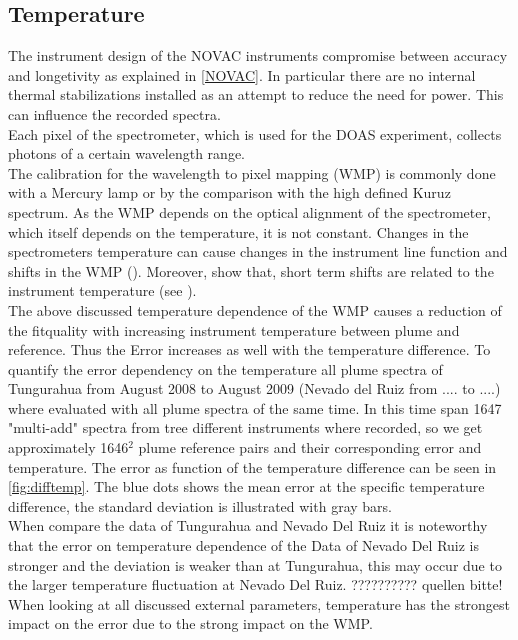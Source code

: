 \documentclass  [
  paper    = a4,
  BCOR     = 10mm,
  twoside,
  fontsize = 12pt,
  fleqn,
  toc      = bibnumbered,
  toc      = listofnumbered,
  numbers  = noendperiod,
  headings = normal,
  listof   = leveldown,
  version  = 3.03
]                                       {scrreprt}
\begin{document}
	\subsection{Temperature}
	The instrument design of the NOVAC instruments compromise between accuracy and longetivity as explained in \cref{NOVAC}. In particular there are no internal thermal stabilizations installed as an attempt to reduce the need for power. This can influence the recorded spectra.\\	
	Each pixel of the spectrometer, which is used for the DOAS experiment, collects photons of a certain wavelength range.\\
	The calibration for the wavelength to pixel mapping (WMP) is commonly done with a Mercury lamp or by the comparison with the high defined Kuruz spectrum.
	As the WMP depends on the optical alignment of the spectrometer, which itself depends on the temperature, it is not constant.
	Changes in the spectrometers temperature can cause changes in the instrument line function and shifts in the WMP (\cite{pinardi2007influence}). 
	Moreover, \cite{WarnachSimon} show that, short term shifts are related to the instrument temperature (see ).\\
	The above discussed temperature dependence of the WMP causes a reduction of the fitquality with increasing instrument temperature between plume and reference. Thus the  Error increases as well with the temperature difference. To quantify the  error dependency on the temperature all plume spectra of Tungurahua from August 2008 to August 2009 (Nevado del Ruiz from .... to ....) where evaluated with all plume spectra of the same time. In this time span 1647 "multi-add" spectra from tree different instruments where recorded, so we get approximately 1646$^2$ plume reference pairs and their corresponding  error and temperature. The  error as function of the temperature difference can be seen in \cref{fig:difftemp}. The blue dots shows the mean  error at the specific temperature difference, the standard deviation is illustrated with gray bars.\\
	When compare the data of Tungurahua  and Nevado Del Ruiz it is noteworthy that the  error on temperature dependence of the Data of Nevado Del Ruiz is stronger and the deviation is weaker than at Tungurahua, this may occur due to the larger temperature fluctuation at Nevado Del Ruiz. ?????????? quellen bitte!\\
	When looking at all discussed external parameters, temperature has  the strongest impact on the  error due to the strong impact on the WMP.
\end{document}
